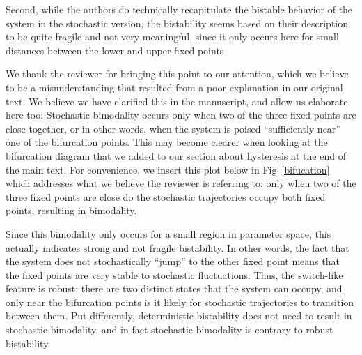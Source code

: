 \documentclass[11pt,letterpaper]{article}
\begin{document}
\begin{review}
Second, while the authors do technically recapitulate the bistable
behavior of the system in the stochastic version, the bistability seems
based on their description to be quite fragile and not very meaningful,
since it only occurs here for small distances between the lower and
upper fixed points
\end{review}

\begin{response}
We thank the reviewer for bringing this point to our attention, which we
believe to be a misunderstanding that resulted from a poor explanation
in our original text. We believe we have clarified this in the
manuscript, and allow us elaborate here too: Stochastic bimodality occurs
only when two of the three fixed points are close together, or in other
words, when the system is poised ``sufficiently near'' one of the
bifurcation points. This may become clearer when looking at the
bifurcation diagram that we added to our section about hysteresis at the
end of the main text. For convenience, we insert this plot below in
Fig~\ref{bifucation} which addresses what we believe the reviewer is
referring to: only when two of the three fixed points are close do the
stochastic trajectories occupy both fixed points, resulting in
bimodality.

Since this bimodality only occurs for a small region in parameter space,
this actually indicates strong and not fragile bistability. In other
words, the fact that the system does not stochastically ``jump'' to the
other fixed point means that the fixed points are very stable to
stochastic fluctuations. Thus, the switch-like feature is robust:
there are two distinct states that the system can occupy, and only near
the bifurcation points is it likely for stochastic trajectories to
transition between them. Put differently, deterministic bistability does
not need to result in stochastic bimodality, and in fact stochastic
bimodality is contrary to robust bistability.
\end{response}
\end{document}

